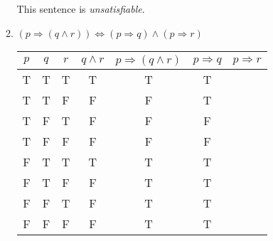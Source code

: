 \documentclass{article}
\begin{document}
\begin{enumerate}
\begin{enumerate}
				This sentence is \emph{unsatisfiable}.
				
			\item $(p \Rightarrow ( q \wedge r)) \Leftrightarrow (p \Rightarrow q) \wedge (p \Rightarrow r)$
			
				\begin{tabular}{|c|c|c|c|c|c|c|}
					\hline
					$p$ & $q$ & $r$ & $q \wedge r$ & $p \Rightarrow (q \wedge r)$ & $p \Rightarrow q$ 
					& $p \Rightarrow r$ \\
					\hline
					T & T & T & T & T & T\\
					\hline
					T & T & F & F & F & T\\
					\hline
					T & F & T & F & F & F\\
					\hline
					T & F & F & F & F & F\\
					\hline
					F & T & T & T & T & T\\
					\hline
					F & T & F & F & T & T\\
					\hline
					F & F & T & F & T & T\\
					\hline
					F & F & F & F & T & T\\
					\hline
				\end{tabular}
		\end{enumerate}
\end{enumerate}
\end{document}
